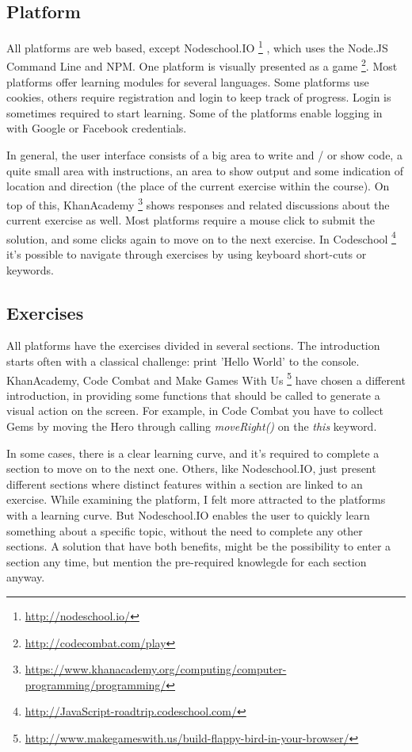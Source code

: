 \documentclass{article}
\begin{document}
\subsection{Platform}
All platforms are web based, except Nodeschool.IO
\footnote{\url{http://nodeschool.io/}}
, which uses the Node.JS 
Command Line and NPM. One platform is visually presented as a game
\footnote{\url{http://codecombat.com/play}}. Most platforms offer learning
modules for several languages. Some platforms use cookies, 
others require registration and login to keep track of progress. Login is 
sometimes required to start learning. Some of the platforms enable logging in 
with Google or Facebook credentials.


In general, the user interface consists of a big area to write and / or show 
code, a quite small area with instructions, an area to show output and some 
indication of location and direction (the place of the current exercise within 
the course). On top of this, KhanAcademy
\footnote{
\url{https://www.khanacademy.org/computing/computer-programming/programming/}} 
shows responses and related discussions about the current exercise as
well. Most platforms require a mouse click to submit the solution, and some
clicks again to
move on to the next exercise. In Codeschool
\footnote{\url{http://JavaScript-roadtrip.codeschool.com/}} 
it's possible to navigate through exercises by using keyboard short-cuts or 
keywords.

\subsection{Exercises}
All platforms have the exercises divided in several sections. The introduction
starts often with a classical challenge: print 'Hello World' to the console. 
KhanAcademy, Code Combat and Make Games With Us
\footnote{\url{http://www.makegameswith.us/build-flappy-bird-in-your-browser/}}
have chosen a different introduction, in providing some functions that should be
called to generate a visual action on the screen. For example, in Code Combat 
you have to collect Gems by moving the Hero through calling {\em moveRight()} on 
the { \em this} keyword.


In some cases, there is a clear learning curve, and it's required to complete a
section to move on to the next one. Others, like Nodeschool.IO, just present 
different sections where distinct features within a section are linked to an
exercise. While examining the platform, I felt more attracted to the platforms
with a learning curve. But Nodeschool.IO enables the user to quickly learn 
something about a specific topic, without the need to complete any other
sections. A solution that have both benefits, might be the possibility to 
enter a section any time, but mention the pre-required knowlegde for each
section anyway. 
\end{document}
